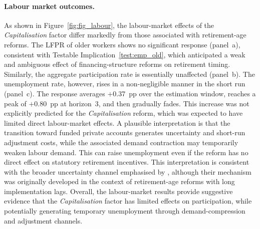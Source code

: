 \documentclass[11pt,english,a4paper, twoside, authoryear]{article}
\begin{document}
\paragraph{Labour market outcomes.} As shown in Figure~\ref{fig:fig_labour}, the labour-market effects of the \textit{Capitalisation} factor differ markedly from those associated with retirement-age reforms. The LFPR of older workers shows no significant response (panel~a), consistent with Testable Implication~\ref{test:emp_old}, which anticipated a weak and ambiguous effect of financing-structure reforms on retirement timing. Similarly, the aggregate participation rate is essentially unaffected (panel~b). The unemployment rate, however, rises in a non-negligible manner in the short run (panel~c). The response averages $+$0.37~pp over the estimation window, reaches a peak of $+$0.80~pp at horizon~3, and then gradually fades. This increase was not explicitly predicted for the \textit{Capitalisation} reform, which was expected to have limited direct labour-market effects. A plausible interpretation is that the transition toward funded private accounts generates uncertainty and short-run adjustment costs, while the associated demand contraction may temporarily weaken labour demand. This can raise unemployment even if the reform has no direct effect on statutory retirement incentives. This interpretation is consistent with the broader uncertainty channel emphasised by \citet{BiZubairy2023}, although their mechanism was originally developed in the context of retirement-age reforms with long implementation lags. Overall, the labour-market results provide suggestive evidence that the \textit{Capitalisation} factor has limited effects on participation, while potentially generating temporary unemployment through demand-compression and adjustment channels.
\end{document}
